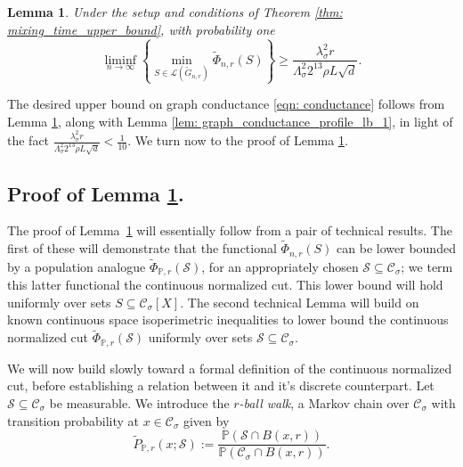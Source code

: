 \documentclass[11pt,twoside]{article}
\newtheorem{lemma}{Lemma}
\newcommand{\1}{\mathbf{1}}
\newcommand{\Pbb}{\mathbb{P}}
\newcommand{\Sset}{\mathcal{S}}
\newcommand{\Cset}{\mathcal{C}}
\newcommand{\Csig}{\Cset_{\sigma}}
\begin{document}
\begin{lemma}
	\label{lem: graph_conductance_profile_lb}
	Under the setup and conditions of Theorem \ref{thm: mixing_time_upper_bound}, with probability one
	\begin{equation}
	\label{eqn: graph_conductance_profile_lb}
	\liminf_{n \to \infty} \left\{ \min_{S \in \mathcal{L}(\widetilde{G}_{n,r})} \widetilde{\Phi}_{n,r}(S) \right\} \geq \frac{\lambda_{\sigma}^2 r}{\Lambda_{\sigma}^2 2^{13} \rho L \sqrt{d}}.
	\end{equation}
\end{lemma}

The desired upper bound on graph conductance \eqref{eqn: conductance} follows from Lemma \ref{lem: graph_conductance_profile_lb}, along with Lemma \ref{lem: graph_conductance_profile_lb_1}, in light of the fact $\frac{\lambda_{\sigma}^2 r}{\Lambda_{\sigma}^2 2^{13} \rho L \sqrt{d}} < \frac{1}{10}$. We turn now to the proof of Lemma \ref{lem: graph_conductance_profile_lb}.

\subsection{Proof of Lemma \ref{lem: graph_conductance_profile_lb}.}

The proof of Lemma~\ref{lem: graph_conductance_profile_lb} will essentially follow from a pair of technical results. The first of these will demonstrate that the functional $\widetilde{\Phi}_{n,r}(S)$ can be lower bounded by a population analogue $\widetilde{\Phi}_{\Pbb,r}(\Sset)$, for an appropriately chosen $\Sset \subseteq \Csig$; we term this latter functional the continuous normalized cut. This lower bound will hold uniformly over sets $S \subseteq \Csig[X]$. The second technical Lemma will build on known continuous space isoperimetric inequalities to lower bound the continuous normalized cut $\widetilde{\Phi}_{\Pbb,r}(\Sset)$ uniformly over sets $\Sset \subseteq \Csig$.

We will now build slowly toward a formal definition of the continuous normalized cut, before establishing a relation between it and it's discrete counterpart. Let $\Sset \subseteq \Csig$ be measurable. We introduce the \emph{$r$-ball walk}, a Markov chain over $\Csig$ with transition probability at $x \in \Csig$ given by 
\begin{equation*}
\widetilde{P}_{\Pbb,r}(x; \Sset) := \frac{\Pbb(\Sset \cap B(x,r))}{\Pbb(\Csig \cap B(x,r))}.
\end{equation*}
\end{document}

